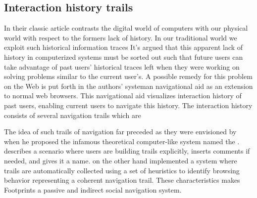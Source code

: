 \subsection{Interaction history trails}
\label{section:social.navigation.applied.forms.interaction.history}

In their classic article \citet{wexelblat99} contrasts the digital world of
computers with our physical world with respect to the formers lack of history.
In our traditional world we exploit such historical information traces
It's argued that this apparent lack of history in computerized systems must
be sorted out such that future users can take advantage
of past users' historical traces left when they were working
on solving problems similar to the current user's.
A possible remedy for this problem on the Web is put forth in the authors'
 system\dash{}an navigational aid as an extension to
normal web browsers. This navigational aid visualizes interaction history of
past users, enabling current users to navigate this history.
The interaction history consists of several navigation trails which are

The idea of such trails of navigation far preceded \citeauthor{wexelblat99}
as they were envisioned by \citet{bush45} when he proposed the infamous
theoretical computer-like system named the .%
\citeauthor{bush45} describes a scenario where users are building trails
explicitly, inserts comments if needed, and gives it a name.
\citeauthor{wexelblat99} on the other hand
implemented a system where trails are automatically collected using a set of
heuristics to identify browsing behavior representing a coherent navigation
trail. These characteristics makes Footprints a passive and indirect social
navigation system.

